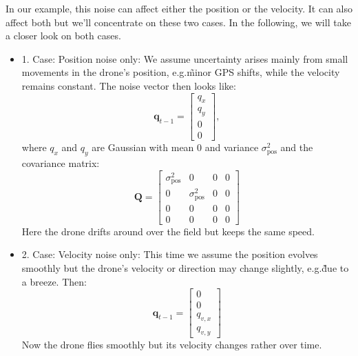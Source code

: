 \begin{example}
In our example, this noise can affect either the position or the velocity. It can also affect both but we'll concentrate on these two cases. In the following, we will take a closer look on both cases. 

\begin{itemize}
    \item{1. Case: Position noise only:} We assume uncertainty arises mainly from small movements in the drone's position, e.g.\~ minor GPS shifts, while the velocity remains constant. The noise vector then looks like:
    \[\mathbf{q}_{t-1} = \begin{bmatrix}
        q_x \\
        q_y \\
        0 \\
        0
    \end{bmatrix},\]
    where $q_x$ and $q_y$ are Gaussian with mean $0$ and variance $\sigma_\text{pos}^2$ and the covariance matrix: 
    \[\mathbf{Q}=\begin{bmatrix}
        \sigma_\text{pos}^2 & 0 & 0 & 0 \\
        0 & \sigma_\text{pos}^2 & 0 & 0 \\
        0 & 0 & 0 & 0 \\
        0 & 0 & 0 & 0 
    \end{bmatrix}\]
    Here the drone drifts around over the field but keeps the same speed. 
    
    \item{2. Case: Velocity noise only:} This time we assume the position evolves smoothly but the drone's velocity or direction may change slightly, e.g.\~due to a breeze. Then:
    \[\mathbf{q}_{t-1}= \begin{bmatrix}
        0 \\
        0 \\
        q_{v,x} \\
        q_{v,y}
    \end{bmatrix}\]
    Now the drone flies smoothly but its velocity changes rather over time. 
\end{itemize}
\end{example}




